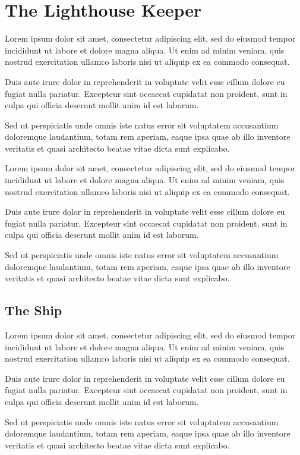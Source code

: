 \documentclass{memoir}
\begin{document}
\chapter{The Lighthouse Keeper}
Lorem ipsum dolor sit amet, consectetur adipiscing elit, sed do eiusmod tempor incididunt ut labore et dolore magna aliqua. Ut enim ad minim veniam, quis nostrud exercitation ullamco laboris nisi ut aliquip ex ea commodo consequat.

Duis aute irure dolor in reprehenderit in voluptate velit esse cillum dolore eu fugiat nulla pariatur. Excepteur sint occaecat cupidatat non proident, sunt in culpa qui officia deserunt mollit anim id est laborum.

Sed ut perspiciatis unde omnis iste natus error sit voluptatem accusantium doloremque laudantium, totam rem aperiam, eaque ipsa quae ab illo inventore veritatis et quasi architecto beatae vitae dicta sunt explicabo.

Lorem ipsum dolor sit amet, consectetur adipiscing elit, sed do eiusmod tempor incididunt ut labore et dolore magna aliqua. Ut enim ad minim veniam, quis nostrud exercitation ullamco laboris nisi ut aliquip ex ea commodo consequat.

Duis aute irure dolor in reprehenderit in voluptate velit esse cillum dolore eu fugiat nulla pariatur. Excepteur sint occaecat cupidatat non proident, sunt in culpa qui officia deserunt mollit anim id est laborum.

Sed ut perspiciatis unde omnis iste natus error sit voluptatem accusantium doloremque laudantium, totam rem aperiam, eaque ipsa quae ab illo inventore veritatis et quasi architecto beatae vitae dicta sunt explicabo.
\section{The Ship}
Lorem ipsum dolor sit amet, consectetur adipiscing elit, sed do eiusmod tempor incididunt ut labore et dolore magna aliqua. Ut enim ad minim veniam, quis nostrud exercitation ullamco laboris nisi ut aliquip ex ea commodo consequat.

Duis aute irure dolor in reprehenderit in voluptate velit esse cillum dolore eu fugiat nulla pariatur. Excepteur sint occaecat cupidatat non proident, sunt in culpa qui officia deserunt mollit anim id est laborum.

Sed ut perspiciatis unde omnis iste natus error sit voluptatem accusantium doloremque laudantium, totam rem aperiam, eaque ipsa quae ab illo inventore veritatis et quasi architecto beatae vitae dicta sunt explicabo.
\end{document}
